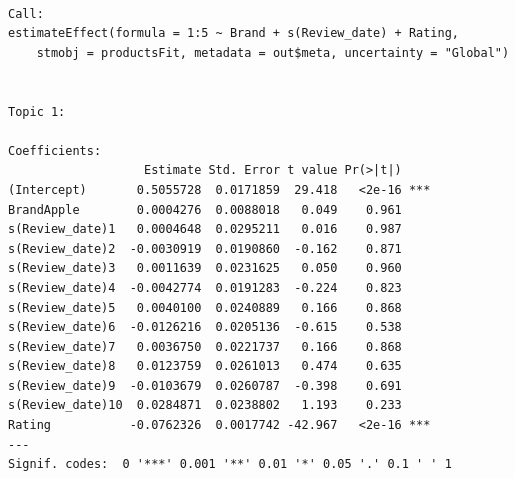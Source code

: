 \begin{Shaded}
\begin{Highlighting}[]
\SpecialCharTok{$}\SpecialCharTok{$}\OtherTok{\textless{}{-}} \SpecialCharTok{$}\SpecialCharTok{$}

\OtherTok{\textless{}{-}} \NormalTok{(}\SpecialCharTok{:} \SpecialCharTok{\textasciitilde{}}\SpecialCharTok{+}\SpecialCharTok{+}\SpecialCharTok{$} \NormalTok{)}

 \NormalTok{)}
\end{Highlighting}
\end{Shaded}

\begin{verbatim}

Call:
estimateEffect(formula = 1:5 ~ Brand + s(Review_date) + Rating, 
    stmobj = productsFit, metadata = out$meta, uncertainty = "Global")


Topic 1:

Coefficients:
                   Estimate Std. Error t value Pr(>|t|)    
(Intercept)       0.5055728  0.0171859  29.418   <2e-16 ***
BrandApple        0.0004276  0.0088018   0.049    0.961    
s(Review_date)1   0.0004648  0.0295211   0.016    0.987    
s(Review_date)2  -0.0030919  0.0190860  -0.162    0.871    
s(Review_date)3   0.0011639  0.0231625   0.050    0.960    
s(Review_date)4  -0.0042774  0.0191283  -0.224    0.823    
s(Review_date)5   0.0040100  0.0240889   0.166    0.868    
s(Review_date)6  -0.0126216  0.0205136  -0.615    0.538    
s(Review_date)7   0.0036750  0.0221737   0.166    0.868    
s(Review_date)8   0.0123759  0.0261013   0.474    0.635    
s(Review_date)9  -0.0103679  0.0260787  -0.398    0.691    
s(Review_date)10  0.0284871  0.0238802   1.193    0.233    
Rating           -0.0762326  0.0017742 -42.967   <2e-16 ***
---
Signif. codes:  0 '***' 0.001 '**' 0.01 '*' 0.05 '.' 0.1 ' ' 1
\end{verbatim}

